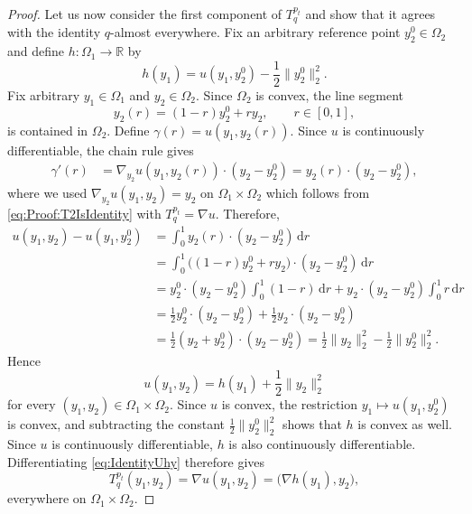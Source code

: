 \documentclass[10pt,a4paper]{amsart}
\newcommand{\R}{\mathbb{R}}
\begin{document}
\begin{proof}
Let us now consider the first component of $T_q^{p_t}$ and show that it agrees with the identity $q$-almost everywhere. Fix an arbitrary reference point $y_2^0\in\Omega_2$ and define
$h:\Omega_1\to\R$ by
\[
    h(y_1)
    =
    u(y_1,y_2^0)
    -
    \frac12\|y_2^0\|_2^2.
\]
Fix arbitrary $y_1\in\Omega_1$ and $y_2\in\Omega_2$. Since $\Omega_2$
is convex, the line segment
\[
    y_2(r)=(1-r)y_2^0+ry_2,
    \qquad r\in[0,1],
\]
is contained in $\Omega_2$. Define
$\gamma(r)=u(y_1,y_2(r))$. Since $u$ is continuously differentiable, the chain rule gives
\begin{align*}
    \gamma'(r)
    &=
    \nabla_{y_2}u(y_1,y_2(r))
    \cdot
    (y_2-y_2^0) =
    y_2(r)\cdot(y_2-y_2^0),
\end{align*}
where we used
$\nabla_{y_2}u(y_1,y_2)=y_2$ on
$\Omega_1\times\Omega_2$ which follows from \eqref{eq:Proof:T2IsIdentity} with $T_{q}^{p_t} = \nabla u$. Therefore,
\begin{align*}
    u(y_1,y_2)-u(y_1,y_2^0)
    &= \int_0^1 y_2(r)\cdot(y_2-y_2^0)\,\mathrm dr \\
    &= \int_0^1 \bigl((1-r)y_2^0+ry_2\bigr)\cdot(y_2-y_2^0)\,\mathrm dr \\
    &= y_2^0\cdot(y_2-y_2^0)\int_0^1(1-r)\,\mathrm dr
       + y_2\cdot(y_2-y_2^0)\int_0^1r\,\mathrm dr \\
    &= \frac12 y_2^0\cdot(y_2-y_2^0)
       + \frac12 y_2\cdot(y_2-y_2^0) \\
    &= \frac12 (y_2+y_2^0)\cdot(y_2-y_2^0)
     = \frac12\|y_2\|_2^2-\frac12\|y_2^0\|_2^2.
\end{align*}
Hence
\begin{equation}\label{eq:IdentityUhy}
    u(y_1,y_2)
    =
    h(y_1)
    +
    \frac12\|y_2\|_2^2
\end{equation}
for every $(y_1,y_2)\in\Omega_1\times\Omega_2$.
Since $u$ is convex, the restriction $y_1\mapsto u(y_1,y_2^0)$ is convex, and subtracting the constant $\frac12\|y_2^0\|_2^2$ shows that $h$ is convex as well.
Since $u$ is continuously differentiable, $h$ is also continuously differentiable. Differentiating \eqref{eq:IdentityUhy} therefore gives
\[
    T_q^{p_t}(y_1,y_2)
    =
    \nabla u(y_1,y_2)
    =
    \bigl(
        \nabla h(y_1),
        y_2
    \bigr),
\]
everywhere on $\Omega_1 \times \Omega_2$. 


\end{proof}
\end{document}
